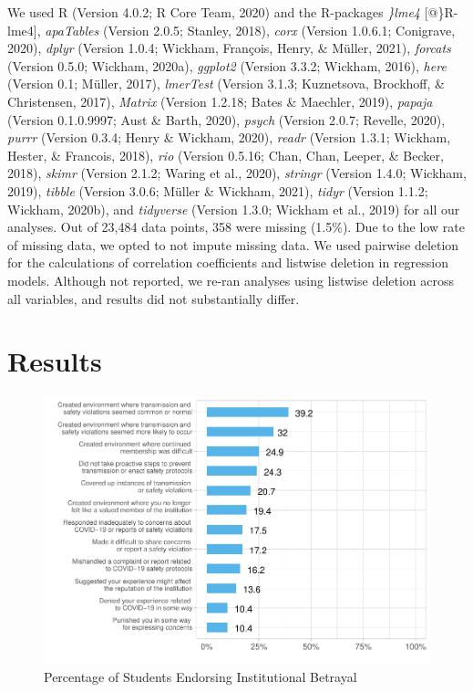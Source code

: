\documentclass[
  english,
  man, noextraspace]{apa6}
\begin{document}
We used R (Version 4.0.2; R Core Team, 2020) and the R-packages \emph{\}lme4} {[}@\}R-lme4{]}, \emph{apaTables} (Version 2.0.5; Stanley, 2018), \emph{corx} (Version 1.0.6.1; Conigrave, 2020), \emph{dplyr} (Version 1.0.4; Wickham, François, Henry, \& Müller, 2021), \emph{forcats} (Version 0.5.0; Wickham, 2020a), \emph{ggplot2} (Version 3.3.2; Wickham, 2016), \emph{here} (Version 0.1; Müller, 2017), \emph{lmerTest} (Version 3.1.3; Kuznetsova, Brockhoff, \& Christensen, 2017), \emph{Matrix} (Version 1.2.18; Bates \& Maechler, 2019), \emph{papaja} (Version 0.1.0.9997; Aust \& Barth, 2020), \emph{psych} (Version 2.0.7; Revelle, 2020), \emph{purrr} (Version 0.3.4; Henry \& Wickham, 2020), \emph{readr} (Version 1.3.1; Wickham, Hester, \& Francois, 2018), \emph{rio} (Version 0.5.16; Chan, Chan, Leeper, \& Becker, 2018), \emph{skimr} (Version 2.1.2; Waring et al., 2020), \emph{stringr} (Version 1.4.0; Wickham, 2019), \emph{tibble} (Version 3.0.6; Müller \& Wickham, 2021), \emph{tidyr} (Version 1.1.2; Wickham, 2020b), and \emph{tidyverse} (Version 1.3.0; Wickham et al., 2019) for all our analyses. Out of 23,484 data points, 358 were missing (1.5\%). Due to the low rate of missing data, we opted to not impute missing data. We used pairwise deletion for the calculations of correlation coefficients and listwise deletion in regression models. Although not reported, we re-ran analyses using listwise deletion across all variables, and results did not substantially differ.

\hypertarget{results}{%
\section{Results}\label{results}}

\begin{figure}[H]

{\centering \includegraphics[width=\textwidth]{papaja_doc_files/figure-latex/figure1-1} 

}

\caption{Percentage of Students Endorsing Institutional Betrayal
}\label{fig:figure1}
\end{figure}
\end{document}
